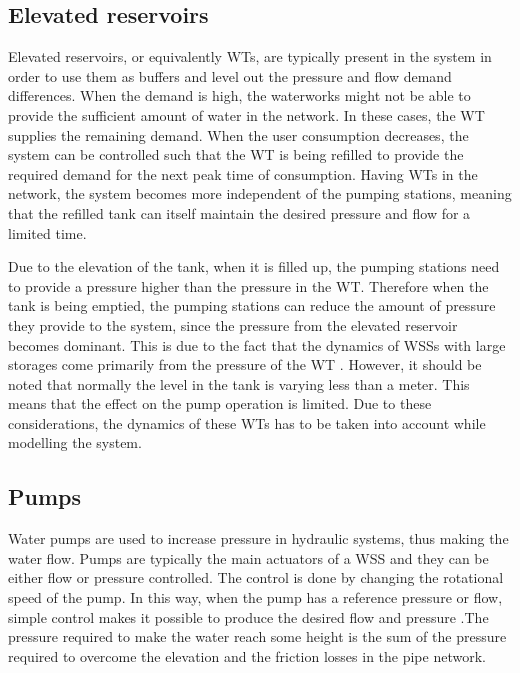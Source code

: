 \subsection{Elevated reservoirs}
\label{elevated_reservoirs}

Elevated reservoirs, or equivalently WTs, are typically present in the system in order to use them as buffers and level out the pressure and flow demand differences. When the demand is high, the waterworks might not be able to provide the sufficient amount of water in the network. In these cases, the WT supplies the remaining demand. When the user consumption decreases, the system can be controlled such that the WT is being refilled to provide the required demand for the next peak time of consumption. Having WTs in the network, the system becomes more independent of the pumping stations, meaning that the refilled tank can itself maintain the desired pressure and flow for a limited time. 

Due to the elevation of the tank, when it is filled up, the pumping stations need to provide a pressure higher than the pressure in the WT. Therefore when the tank is being emptied, the pumping stations can reduce the amount of pressure they provide to the system, since the pressure from the elevated reservoir becomes dominant. This is due to the fact that the dynamics of WSSs with large storages come primarily from the pressure of the WT \cite{8thsemester_project}. However, it should be noted that normally the level in the tank is varying less than a meter. This means that the effect on the pump operation is limited. Due to these considerations, the dynamics of these WTs has to be taken into account while modelling the system. 

\subsection{Pumps}
\label{pumps}

Water pumps are used to increase pressure in hydraulic systems, thus making the water flow. Pumps are typically the main actuators of a WSS and they can be either flow or pressure controlled. The control is done by changing the rotational speed of the pump. In this way, when the pump has a reference pressure or flow, simple control makes it possible to produce the desired flow and pressure \cite{kallesoePHD}.The pressure required to make the water reach some height is the sum of the pressure required to overcome the elevation and the friction losses in the pipe network. 

